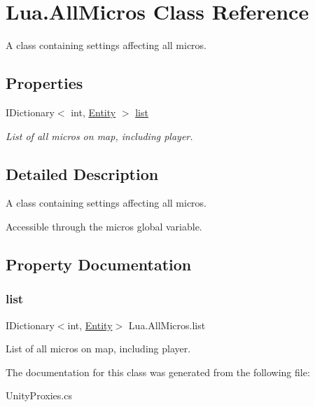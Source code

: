 \hypertarget{class_lua_1_1_all_micros}{}\section{Lua.\+All\+Micros Class Reference}
\label{class_lua_1_1_all_micros}


A class containing settings affecting all micros.  


\subsection*{Properties}
\begin{DoxyCompactItemize}
\item 
I\+Dictionary$<$ int, \mbox{\hyperlink{class_lua_1_1_entity}{Entity}} $>$ \mbox{\hyperlink{class_lua_1_1_all_micros_a1e4ae6a9f876819f84b19737405d2a8e}{list}}
\begin{DoxyCompactList}\small\item\em List of all micros on map, including player. \end{DoxyCompactList}\end{DoxyCompactItemize}


\subsection{Detailed Description}
A class containing settings affecting all micros. 

Accessible through the {\ttfamily micros} global variable. 

\subsection{Property Documentation}
\mbox{\label{class_lua_1_1_all_micros_a1e4ae6a9f876819f84b19737405d2a8e}} 
\subsubsection{\texorpdfstring{list}{list}}
{\footnotesize\ttfamily I\+Dictionary$<$int, \mbox{\hyperlink{class_lua_1_1_entity}{Entity}}$>$ Lua.\+All\+Micros.\+list\hspace{0.3cm}{\ttfamily [get]}}



List of all micros on map, including player. 



The documentation for this class was generated from the following file\+:\begin{DoxyCompactItemize}
\item 
Unity\+Proxies.\+cs\end{DoxyCompactItemize}
